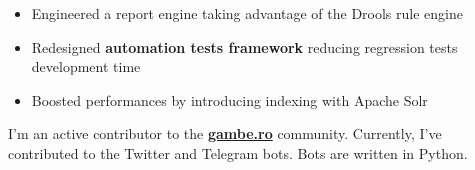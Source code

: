 \documentclass[10pt,a4paper,ragged2e]{altacv}
\begin{document}
\begin{itemize}
\item Engineered a report engine taking advantage of the Drools rule engine
\item Redesigned \textbf{automation tests framework} reducing regression tests development time
\item Boosted performances by introducing indexing with Apache Solr
\end{itemize}

\divider



I'm an active contributor to the \textbf{\href{http://gambe.ro}{gambe.ro}} community. Currently, I've contributed to the Twitter and Telegram bots. Bots are written in Python.

\divider

\medskip

\clearpage

\end{document}
